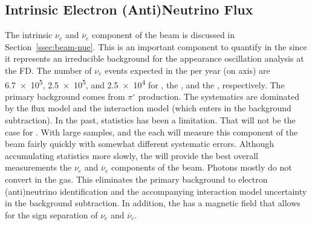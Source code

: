 \subsection{Intrinsic Electron (Anti)Neutrino Flux}
The intrinsic $\nu_{e}$ and $\overline{\nu}_{e}$ component of the beam is 
discussed in Section~\ref{ssec:beam-nue}.  This is an important component to quantify in the   since it represents an irreducible background for the appearance oscillation analysis at the FD.  The number of  $\nu_{e}$ events expected in the  per year (on axis) are \num{6.7e5}, \num{2.5e5}, and \num{2.5e4} for , the , and the , respectively.  The primary background comes from $\pi^{\circ}$ production.  The systematics are dominated by the flux model and the interaction model (which enters in the background subtraction).  In the past, statistics has been a limitation.  That will not be the case for  .  With large samples,  and the  each will measure this component of the beam fairly quickly with somewhat different systematic errors.  Although accumulating statistics more slowly, the  will provide the best overall measurements the $\nu_{e}$ and $\overline{\nu}_{e}$ components of the beam.  Photons mostly do not convert in the gas.  This eliminates the primary background to electron (anti)neutrino identification and the accompanying interaction model uncertainty in the background subtraction.  In addition, the  has a magnetic field that allows for the sign separation of $\nu_{e}$ and $\overline{\nu}_{e}$.  


